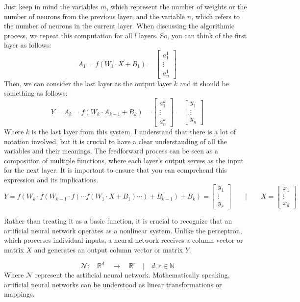 Just keep in mind the variables $m$, which represent the number of weights or the number of neurons from the
previous layer, and the variable $n$, which refers to the number of neurons in the current layer.
When discussing the algorithmic process, we repeat this computation for all $l$ layers. So, you can think of
the first layer as follows:
\[
A_1 = f(W_1 \cdot X + B_1) = \begin{bmatrix} a_{1}^1 \\ \vdots \\ a_{n}^1 \end{bmatrix}
\]
Then, we can consider the last layer as the output layer $k$ and it should be something as follows:
\[
Y = A_k =  f(W_k \cdot A_{k - 1} + B_k) 
= \begin{bmatrix} a_{1}^k \\ \vdots \\ a_{n}^k \end{bmatrix}
= \begin{bmatrix} y_{1} \\ \vdots \\ y_{n} \end{bmatrix}
\]
Where $k$ is the last layer from this system.
I understand that there is a lot of notation involved, but it is crucial to have a clear understanding of all
the variables and their meanings. The feedforward process can be seen as a composition of multiple functions,
where each layer's output serves as the input for the next layer. It is important to ensure that you can
comprehend this expression and its implications.
\[
Y = f(W_k \cdot f(
W_{k - 1} \cdot f(\cdots f(W_{1} \cdot X + B_1) \cdots) + B_{k - 1}
) + B_k) = \begin{bmatrix} y_1 \\ \vdots \\ y_{r} \end{bmatrix}
\quad \quad | \quad \quad X = \begin{bmatrix} x_1 \\ \vdots \\ x_{d} \end{bmatrix}
\]

Rather than treating it as a basic function, it is crucial to recognize that an artificial
neural network operates
as a nonlinear system. Unlike the perceptron, which processes individual inputs, a neural network receives
a column vector or matrix $X$ and generates an output column vector or matrix $Y$.

\[
\mathcal{N}: \quad \mathbb{R}^d \quad  \rightarrow \quad \mathbb{R}^r \quad | \quad d,r \in \mathbb{N} 
\]
Where $\mathcal{N}$ represent the artificial neural network.
Mathematically speaking, artificial neural networks can be understood as linear transformations or mappings.

